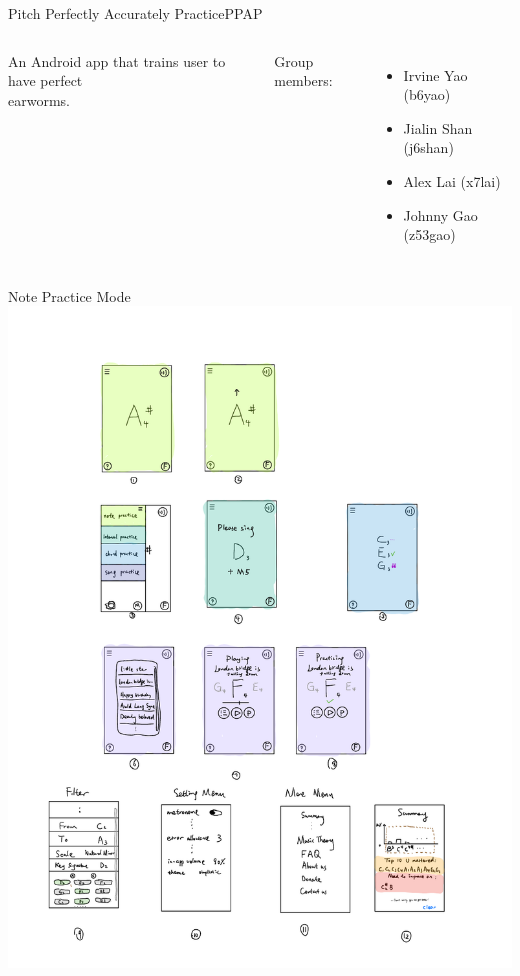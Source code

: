 \documentclass{beamer}
\begin{document}
\begin{frame}{Pitch Perfectly Accurately Practice}{PPAP}
  \begin{columns}[c] %
    An Android app that trains user to have perfect\\ earworms.

     Group members: 
      \begin{itemize}
        \item Irvine Yao (b6yao)
        \item Jialin Shan (j6shan)
        \item Alex Lai (x7lai)
        \item Johnny Gao (z53gao)
      \end{itemize}
    \end{columns}
\end{frame}

\begin{frame}{Note Practice Mode}
  \includegraphics[page=2,width=.6\textwidth] {Slides_materials.pdf}
\end{frame}
\end{document}
